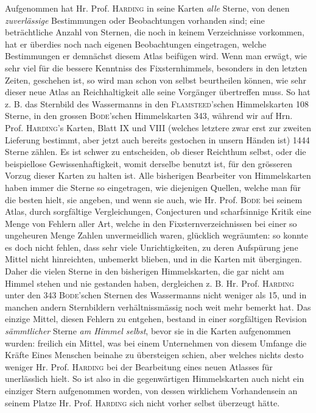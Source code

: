 Aufgenommen hat Hr. Prof. \textsc{Harding} in seine Karten \emph{alle} Sterne, von denen \emph{zuverlässige} Bestimmungen oder Beobachtungen vorhanden sind; eine beträchtliche Anzahl von Sternen, die noch in keinem Verzeichnisse vorkommen, hat er überdies noch nach eigenen Beobachtungen eingetragen, welche Bestimmungen er demnächst diesem Atlas beifügen wird. Wenn man erwägt, wie sehr viel für die bessere Kenntniss des Fixsternhimmels, besonders in den letzten Zeiten, geschehen ist, so wird man schon von selbst beurtheilen können, wie sehr dieser neue Atlas an Reichhaltigkeit alle seine Vorgänger übertreffen muss. So hat z. B. das Sternbild des Wassermanns in den \textsc{Flamsteed}'schen Himmelskarten 108 Sterne, in den grossen \textsc{Bode}'schen Himmelskarten 343, während wir auf Hrn. Prof. \textsc{Harding}'s Karten, Blatt IX und VIII (welches letztere zwar erst zur zweiten Lieferung bestimmt, aber jetzt auch bereits gestochen in unsern Händen ist) 1444 Sterne zählen. Es ist schwer zu entscheiden, ob dieser Reichthum selbst, oder die beispiellose Gewissenhaftigkeit, womit derselbe benutzt ist, für den grösseren Vorzug dieser Karten zu halten ist. Alle bisherigen Bearbeiter von Himmelskarten haben immer die Sterne so eingetragen, wie diejenigen Quellen, welche man für die besten hielt, sie angeben, und wenn sie auch, wie Hr. Prof. \textsc{Bode} bei seinem Atlas, durch sorgfältige Vergleichungen, Conjecturen und scharfsinnige Kritik eine Menge von Fehlern aller Art, welche in den Fixsternverzeichnissen bei einer so ungeheuren Menge Zahlen unvermeidlich waren, glücklich wegräumten: so konnte es doch nicht fehlen, dass sehr viele Unrichtigkeiten, zu deren Aufspürung jene Mittel nicht hinreichten, unbemerkt blieben, und in die Karten mit übergingen. Daher die vielen Sterne in den bisherigen Himmelskarten, die gar nicht am Himmel stehen und nie gestanden haben, dergleichen z. B. Hr. Prof. \textsc{Harding} unter den 343 \textsc{Bode}'schen Sternen des Wassermanns nicht weniger als 15, und in manchen andern Sternbildern verhältnissmässig noch weit mehr bemerkt hat. Das einzige Mittel, diesen Fehlern zu entgehen, bestand in einer sorgfältigen Revision \emph{sämmtlicher} Sterne \emph{am Himmel selbst}, bevor sie in die Karten aufgenommen wurden: freilich ein Mittel, was bei einem Unternehmen von diesem Umfange die Kräfte Eines Menschen beinahe zu übersteigen schien, aber welches nichts desto weniger Hr. Prof. \textsc{Harding} bei der Bearbeitung eines neuen Atlasses für unerlässlich hielt. So ist also in die gegenwärtigen Himmelskarten auch nicht ein einziger Stern aufgenommen worden, von dessen wirklichem Vorhandensein an seinem Platze Hr. Prof. \textsc{Harding} sich nicht vorher selbst überzeugt hätte.

